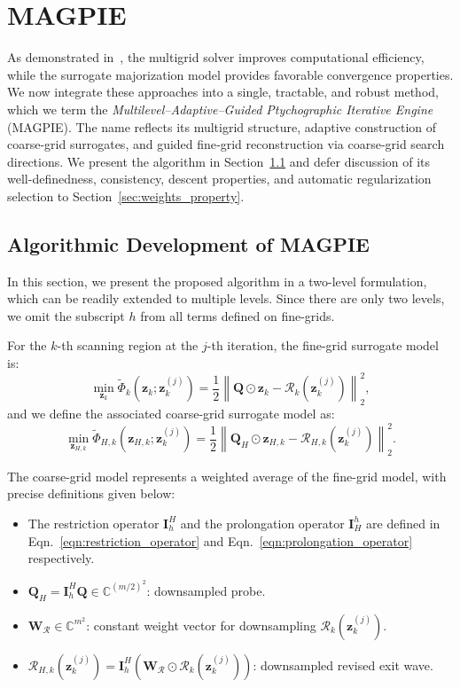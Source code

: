 \documentclass{article}
\numberwithin{equation}{section}
\begin{document}
\section{MAGPIE}\label{sec:multigrid}
As demonstrated in~\cite{MGOPT_ptycho}, the multigrid solver improves computational efficiency, while the surrogate majorization model provides favorable convergence properties. We now integrate these approaches into a single, tractable, and robust method, which we term the \emph{Multilevel–Adaptive–Guided Ptychographic Iterative Engine} (MAGPIE). The name reflects its multigrid structure, adaptive construction of coarse-grid surrogates, and guided fine‐grid reconstruction via coarse‐grid search directions. We present the algorithm in Section~\ref{sec:MAGPIE} and defer discussion of its well-definedness, consistency, descent properties, and automatic regularization selection to Section~\ref{sec:weights_property}.


\subsection{Algorithmic Development of MAGPIE}\label{sec:MAGPIE}
In this section, we present the proposed algorithm in a two-level formulation, which can be readily extended to multiple levels. Since there are only two levels, we omit the subscript $h$ from all terms defined on fine-grids.

For the $k$-th scanning region at the $j$-th iteration, the fine-grid surrogate model is:
\begin{equation}\label{eqn:fine_grid_surrogate_model}
\min_{\bm{z}_k}\widetilde{\Phi}_k\left(\bm{z}_k;\bm{z}_k^{(j)}\right) = \frac{1}{2}\left\|\bm{Q}\odot\bm{z}_k - \mathcal{R}_k\left(\bm{z}_k^{(j)}\right)\right\|_2^2,
\end{equation}
and we define the associated coarse-grid surrogate model as:
\begin{equation}\label{eqn:coarse_grid_surrogate_model}
\min_{\bm{z}_{H,k}} \widetilde{\Phi}_{H,k}\left(\bm{z}_{H,k};\bm{z}_k^{(j)}\right) = \frac{1}{2}\left\|\bm{Q}_H\odot\bm{z}_{H,k} - \mathcal{R}_{H,k}\left(\bm{z}_k^{(j)}\right)\right\|_2^2.
\end{equation}


The coarse-grid model represents a weighted average of the fine-grid model, with precise definitions given below:
\begin{itemize}
    \item The restriction operator $\bm{I}_h^H$ and the prolongation operator $\bm{I}_H^h$ are defined in  Eqn.~\eqref{eqn:restriction_operator} and  Eqn.~\eqref{eqn:prolongation_operator} respectively.  
    \item $\bm{Q}_H = \bm{I}_h^H\bm{Q}\in\mathbb{C}^{(m/2)^2}$: downsampled probe.
    \item $\bm{W}_{\mathcal{R}}\in\mathbb{C}^{m^2}$: {constant} weight vector for downsampling $\mathcal{R}_k\left(\bm{z}_k^{(j)}\right)$.
    \item $\mathcal{R}_{H,k}\left(\bm{z}_k^{(j)}\right) = \bm{I}_h^H\left(\bm{W}_{\mathcal{R}}\odot\mathcal{R}_k\left(\bm{z}_k^{(j)}\right)\right)$: downsampled revised exit wave.
\end{itemize}
\end{document}
